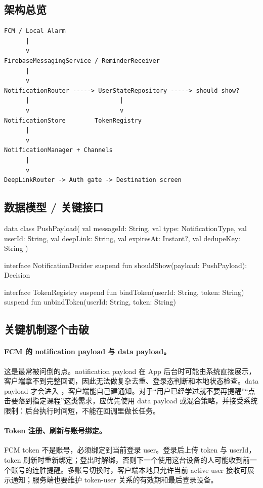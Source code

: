 \subsection{架构总览}

\begin{lstlisting}
FCM / Local Alarm
      |
      v
FirebaseMessagingService / ReminderReceiver
      |
      v
NotificationRouter -----> UserStateRepository -----> should show?
      |                         |
      v                         v
NotificationStore        TokenRegistry
      |
      v
NotificationManager + Channels
      |
      v
DeepLinkRouter -> Auth gate -> Destination screen
\end{lstlisting}

\subsection{数据模型 / 关键接口}

\begin{kotlin}
data class PushPayload(
    val messageId: String,
    val type: NotificationType,
    val userId: String,
    val deepLink: String,
    val expiresAt: Instant?,
    val dedupeKey: String
)

interface NotificationDecider {
    suspend fun shouldShow(payload: PushPayload): Decision
}

interface TokenRegistry {
    suspend fun bindToken(userId: String, token: String)
    suspend fun unbindToken(userId: String, token: String)
}
\end{kotlin}

\subsection{关键机制逐个击破}

\paragraph{FCM 的 notification payload 与 data payload。} \srcinferred 这是最常被问倒的点。notification payload 在 App 后台时可能由系统直接展示，客户端拿不到完整回调，因此无法做复杂去重、登录态判断和本地状态检查。data payload 才会进入 ，客户端能自己建通知。对于“用户已经学过就不要再提醒”“点击要落到指定课程”这类需求，应优先使用 data payload 或混合策略，并接受系统限制：后台执行时间短，不能在回调里做长任务。

\paragraph{Token 注册、刷新与账号绑定。} FCM token 不是账号，必须绑定到当前登录 user。\srcinferred 登录后上传 token 与 userId，token 刷新时重新绑定；登出时解绑，否则下一个使用这台设备的人可能收到前一个账号的连胜提醒。多账号切换时，客户端本地只允许当前 active user 接收可展示通知；服务端也要维护 token-user 关系的有效期和最后登录设备。

